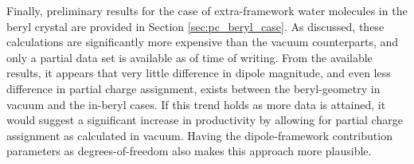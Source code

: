     Finally, preliminary results for the case of extra-framework water molecules in the beryl crystal are provided in Section \ref{sec:pc_beryl_case}. As discussed, these calculations are significantly more expensive than the vacuum counterparts, and only a partial data set is available as of time of writing. From the available results, it appears that very little difference in dipole magnitude, and even less difference in partial charge assignment, exists between the beryl-geometry in vacuum and the in-beryl cases. If this trend holds as more data is attained, it would suggest a significant increase in productivity by allowing for partial charge assignment as calculated in vacuum. Having the dipole-framework contribution parameters as degrees-of-freedom also makes this approach more plausible.